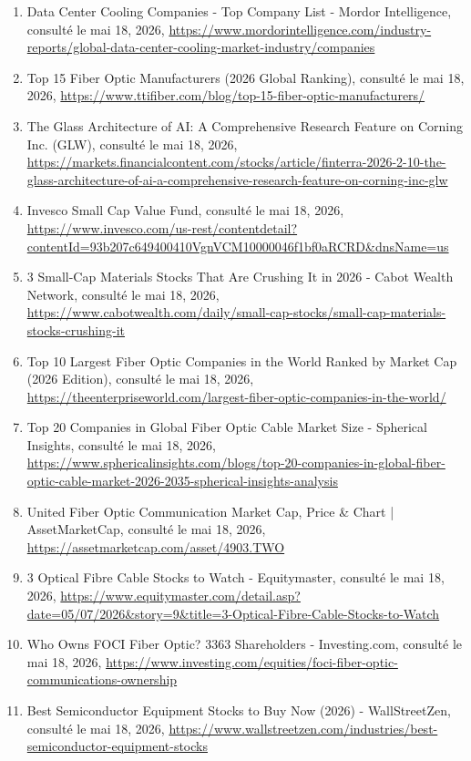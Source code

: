 \documentclass[11pt,a4paper]{article}
\begin{document}
\begin{enumerate}
    \item Data Center Cooling Companies - Top Company List - Mordor Intelligence, consulté le mai 18, 2026, \url{https://www.mordorintelligence.com/industry-reports/global-data-center-cooling-market-industry/companies}
    \item Top 15 Fiber Optic Manufacturers (2026 Global Ranking), consulté le mai 18, 2026, \url{https://www.ttifiber.com/blog/top-15-fiber-optic-manufacturers/}
    \item The Glass Architecture of AI: A Comprehensive Research Feature on Corning Inc. (GLW), consulté le mai 18, 2026, \url{https://markets.financialcontent.com/stocks/article/finterra-2026-2-10-the-glass-architecture-of-ai-a-comprehensive-research-feature-on-corning-inc-glw}
    \item Invesco Small Cap Value Fund, consulté le mai 18, 2026, \url{https://www.invesco.com/us-rest/contentdetail?contentId=93b207c649400410VgnVCM10000046f1bf0aRCRD&dnsName=us}
    \item 3 Small-Cap Materials Stocks That Are Crushing It in 2026 - Cabot Wealth Network, consulté le mai 18, 2026, \url{https://www.cabotwealth.com/daily/small-cap-stocks/small-cap-materials-stocks-crushing-it}
    \item Top 10 Largest Fiber Optic Companies in the World Ranked by Market Cap (2026 Edition), consulté le mai 18, 2026, \url{https://theenterpriseworld.com/largest-fiber-optic-companies-in-the-world/}
    \item Top 20 Companies in Global Fiber Optic Cable Market Size - Spherical Insights, consulté le mai 18, 2026, \url{https://www.sphericalinsights.com/blogs/top-20-companies-in-global-fiber-optic-cable-market-2026-2035-spherical-insights-analysis}
    \item United Fiber Optic Communication Market Cap, Price \& Chart | AssetMarketCap, consulté le mai 18, 2026, \url{https://assetmarketcap.com/asset/4903.TWO}
    \item 3 Optical Fibre Cable Stocks to Watch - Equitymaster, consulté le mai 18, 2026, \url{https://www.equitymaster.com/detail.asp?date=05/07/2026&story=9&title=3-Optical-Fibre-Cable-Stocks-to-Watch}
    \item Who Owns FOCI Fiber Optic? 3363 Shareholders - Investing.com, consulté le mai 18, 2026, \url{https://www.investing.com/equities/foci-fiber-optic-communications-ownership}
    \item Best Semiconductor Equipment Stocks to Buy Now (2026) - WallStreetZen, consulté le mai 18, 2026, \url{https://www.wallstreetzen.com/industries/best-semiconductor-equipment-stocks}

\end{enumerate}
\end{document}
